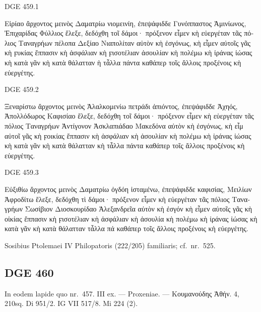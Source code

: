 \begin{versi}{DGE 459.1}
  \begin{greek}
    Εἱρίαο ἄρχοντος μεινὸς Δαματρίω νιομεινίη, ἐπεψάφιδδε {\verso[1]}
    Γυνόππαστος Ἀμινίωνος, Ἐπιχαρίδας Φύλλιος ἔλεξε, δε{\verso}δόχθη τοῖ
    δάμοι· πρόξενον εἶμεν κὴ εὐεργέταν τᾶς πόλιος {\verso} Ταναγρήων πέλοπα
    Δεξίαο Νιαπολίταν αὐτὸν κὴ ἐσγόνως, {\verso} κὴ εἶμεν αὐτοῖς γᾶς κὴ
    ϝυκίας ἔππασιν κὴ ἀσφάλιαν κὴ ϝισοτέλιαν  {\verso}
    ἀσουλίαν κὴ πολέμω κὴ ἰράνας ἰώσας κὴ κατὰ γᾶν κὴ κατὰ θάλατταν
    {\verso} ὴ τἆλλα πάντα καθάπερ τοῖς ἄλλοις προξένοις κὴ
    εὐεργέτης.
  \end{greek}
\end{versi}

\begin{versi}{DGE 459.2}
  \begin{greek}
    Ξεναρίστω ἄρχοντος μεινὸς Ἀλαλκομενίω πετράδι ἀπιόντος, {\verso[1]}
    ἐπεψάφιδδε Ἀχηός, Ἀπολλόδωρος Καφισίαο ἔλεξε, δεδόχθη {\verso} τοῖ
    δάμοι· πρόξενον εἶμεν κὴ εὐεργέταν τᾶς πόλιος Ταναγρήων {\verso}
    Ἀντίγονον Ἀσκλαπιάδαο Μακεδόνα αὐτὸν κὴ ἐσγόνως, κὴ εἶμ
    {\verso} αὐτοῖ γᾶς κὴ ϝοικίας ἔππασιν κὴ ἀσφάλιαν κὴ ἀσουλίαν κὴ πολέμω
    {\verso} κὴ ἰράνας ἰώσας κὴ κατὰ γᾶν κὴ κατὰ θάλατταν κὴ τἆλλα πάντα
    {\verso} καθάπερ τοῖς ἄλλοις προξένοις κὴ εὐεργέτης.
  \end{greek}
\end{versi}

\begin{versi}{DGE 459.3}
  \begin{greek}
    Εὐξιθίω ἄρχοντος μεινὸς Δαματρίω ὀγδόη ἱσταμένω, ἐπεψάφιδδε καφισίας,
    {\verso[1]} Μειλίων Ἀφροδίτω ἔλεξε, δεδόχθη τὶ δάμοι· πρόξενον εἶμεν κὴ
    εὐεργέταν {\verso} τᾶς πόλιος Ταναγρήων Σωσίβιον Διοσκουρίδαο
    Ἀλεξανδρεῖα αὐτὸν κὴ ἐσγόν {\verso} κὴ εἶμεν αὐτοῖς γᾶς κὴ
    οἰκίας ἔππασιν κὴ ϝισοτέλιαν κὴ ἀσφάλιαν κὴ ἀσουλία
    {\verso} κὴ πολέμω κὴ ἰράνας ἰώσας κὴ κατὰ γᾶν κὴ κατὰ θάλατταν
     τἆλλα πά {\verso} καθάπερ τοῖς ἄλλοις
    προξένοις κὴ εὐεργέτης.
  \end{greek}
\end{versi}

Sosibius Ptolemaei IV Philopatoris (222/205) familiaris; cf.\ nr.\ 525.


\subsection{DGE 460}
In eodem lapide quo nr.\ 457. III ex. — Proxeniae. —
\textgreek{Κουμανούδης Ἀθήν}. 4, 210sq. Di 951/2. IG VII 517/8. Mi 224 (2).

